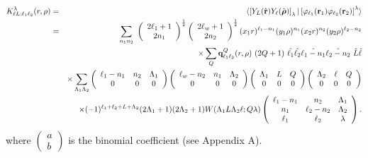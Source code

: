 \documentclass[11pt,a4paper]{article}
\newcommand{\vecr}{{\bf r}}
\newcommand{\brho}{{\mbox{\boldmath $\rho$}}}
\newcommand{\half}{\frac{1}{2}}
\begin{document}
\begin{eqnarray}
 K^\lambda_{\ell L: \ell_1 \ell_2} (r, \rho)
 &=&\langle
   \left [  Y_L (\hat\vecr) Y_\ell (\hat{\brho}) \right ] _ \lambda
    |
   \left [ \varphi_{\ell_1} (\vecr_1)\varphi_{\ell_2} (\vecr_2)
   \right ] ^ \lambda \rangle \nonumber
\\
 &=  &\sum_{n_1 n_2} ~
      \left ( \begin{array}{c} 2 \ell_1 +1\\2n_1\end{array} \right ) ^\half
      \left ( \begin{array}{c} 2 \ell_w +1\\2n_2\end{array} \right ) ^\half
      (x_1 r)^{\ell_1 - n_1}
      (y_1 \rho)^{n_1}
      (x_2 r)^{n_2}
      (y_2 \rho)^{\ell_2 - n_2} \nonumber
\\
&&\times \sum _ Q
      {\bf q}_{\ell_1 \ell_2}^Q (r, \rho) ~
     (2Q+1)~ \hat {\ell_1} \hat {\ell_2} \hat {\ell_1 - n_1} \hat {\ell_2 - n_2} ~
             \hat L \hat \ell  \nonumber
\\
&&\times  \sum_{\Lambda_1 \Lambda_2}
       \left ( \begin{array}{ccc}\ell_1 - n_1&n_2&\Lambda_1\\0&0&0\end{array} \right )
       \left ( \begin{array}{ccc}\ell_w - n_2&n_1&\Lambda_2\\0&0&0\end{array} \right )
       \left ( \begin{array}{ccc}\Lambda_1&L   &Q\\0&0&0\end{array} \right )
       \left ( \begin{array}{ccc}\Lambda_2&\ell&Q\\0&0&0\end{array} \right )  \nonumber
\\
&&\times (-1)^{\ell_1 + \ell_2 +L+ \Lambda_2} (2 \Lambda_1 + 1) (2 \Lambda_2 + 1)
        W(\Lambda_1 L \Lambda_2 \ell; Q \lambda)
        \left ( \begin{array}{ccc} \ell_1-n_1& n_2& \Lambda_1\\
                                   n_1       & \ell_2-n_2& \Lambda_2\\
                                   \ell_1    & \ell_2 & \lambda \end{array} \right )  .
\end{eqnarray}
where $ \left ( \begin{array}{c}a \\ b \end{array}\right ) $ is the binomial coefficient
(see Appendix A).
\end{document}
